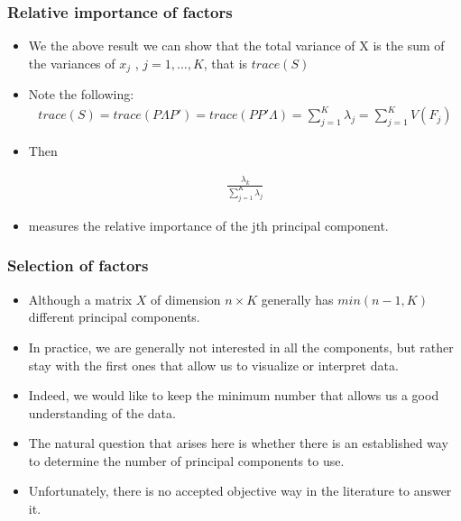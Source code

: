 \documentclass[
  shownotes,
  xcolor={svgnames},
  hyperref={colorlinks,citecolor=DarkBlue,linkcolor=DarkRed,urlcolor=DarkBlue}
  , aspectratio=169]{beamer}
\begin{document}
\begin{frame}
\frametitle{Relative importance of factors}
\begin{itemize}

\item We the above result we can show that the total variance of X is the sum of the variances of $x_j$ , $j = 1, ..., K$, that is $trace(S)$
\medskip
\item Note the following:
\begin{align}
trace(S) = trace(P \Lambda P')= trace(PP' \Lambda ) = \sum_{j=1}^K \lambda_j= \sum_{j=1}^K V(F_j)
\end{align}
\item Then

\begin{align}
\frac{\lambda_k}{\sum_{j=1}^K \lambda_j}
\end{align}

\item measures the relative importance of the jth principal component.
\end{itemize}
\end{frame}

\begin{frame}
\frametitle{Selection of factors}

\begin{itemize}

\item Although a matrix  $X$ of dimension $ n \times K $ generally has $min (n-1, K)$ different principal components.
\medskip
\item  In practice, we are generally not interested in all the components, but rather stay with the first ones that allow us to visualize or interpret data. 
\medskip
\item Indeed, we would like to keep the minimum number that allows us a good understanding of the data. 
\medskip
\item  The natural question that arises here is whether there is an established way to determine the number of principal components to use. 
\medskip
\item Unfortunately, there is no accepted objective way in the literature to answer it. 

\end{itemize}
\end{frame}
\end{document}
